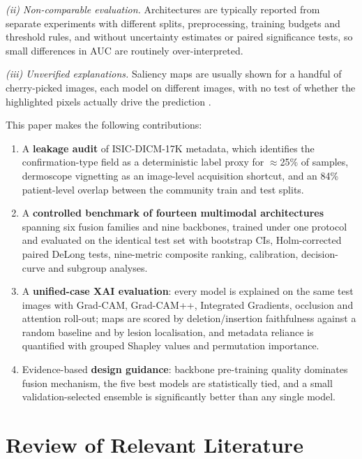 \documentclass[journal]{IEEEtran}
\begin{document}
\textit{(ii) Non-comparable evaluation.} Architectures are typically reported from separate experiments with different splits, preprocessing, training budgets and threshold rules, and without uncertainty estimates or paired significance tests, so small differences in AUC are routinely over-interpreted.

\textit{(iii) Unverified explanations.} Saliency maps are usually shown for a handful of cherry-picked images, each model on different images, with no test of whether the highlighted pixels actually drive the prediction \cite{adebayo2018}.

This paper makes the following contributions:
\begin{enumerate}
\item A \textbf{leakage audit} of ISIC-DICM-17K metadata, which identifies the confirmation-type field as a deterministic label proxy for $\approx$25\% of samples, dermoscope vignetting as an image-level acquisition shortcut, and an 84\% patient-level overlap between the community train and test splits.
\item A \textbf{controlled benchmark of fourteen multimodal architectures} spanning six fusion families and nine backbones, trained under one protocol and evaluated on the identical test set with bootstrap CIs, Holm-corrected paired DeLong tests, nine-metric composite ranking, calibration, decision-curve and subgroup analyses.
\item A \textbf{unified-case XAI evaluation}: every model is explained on the same test images with Grad-CAM, Grad-CAM++, Integrated Gradients, occlusion and attention roll-out; maps are scored by deletion/insertion faithfulness against a random baseline and by lesion localisation, and metadata reliance is quantified with grouped Shapley values and permutation importance.
\item Evidence-based \textbf{design guidance}: backbone pre-training quality dominates fusion mechanism, the five best models are statistically tied, and a small validation-selected ensemble is significantly better than any single model.
\end{enumerate}

\section{Review of Relevant Literature}
\end{document}
